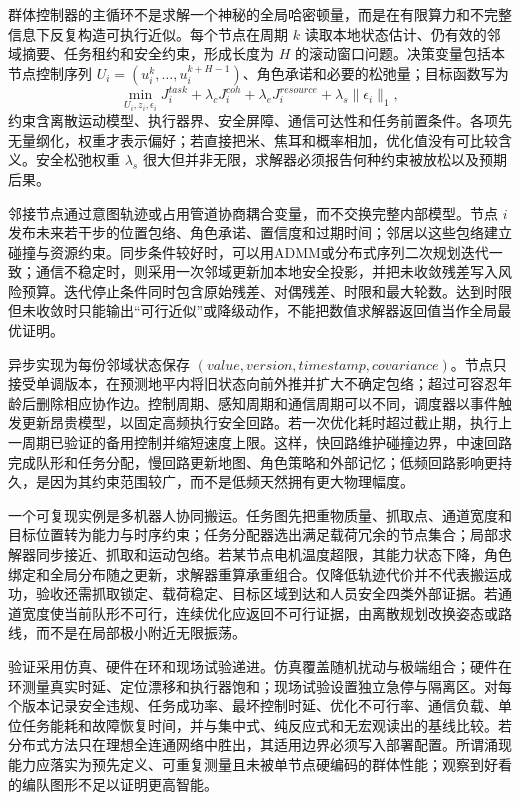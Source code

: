 群体控制器的主循环不是求解一个神秘的全局哈密顿量，而是在有限算力和不完整信息下反复构造可执行近似。每个节点在周期 $k$ 读取本地状态估计、仍有效的邻域摘要、任务租约和安全约束，形成长度为 $H$ 的滚动窗口问题。决策变量包括本节点控制序列 $U_i=(u_i^k,\ldots,u_i^{k+H-1})$、角色承诺和必要的松弛量；目标函数写为
\[
 \min_{U_i,z_i,\epsilon_i} J_i^{task}+\lambda_cJ_i^{coh}
 +\lambda_eJ_i^{resource}+\lambda_s\|\epsilon_i\|_1,
\]
约束含离散运动模型、执行器界、安全屏障、通信可达性和任务前置条件。各项先无量纲化，权重才表示偏好；若直接把米、焦耳和概率相加，优化值没有可比较含义。安全松弛权重 $\lambda_s$ 很大但并非无限，求解器必须报告何种约束被放松以及预期后果。

邻接节点通过意图轨迹或占用管道协商耦合变量，而不交换完整内部模型。节点 $i$ 发布未来若干步的位置包络、角色承诺、置信度和过期时间；邻居以这些包络建立碰撞与资源约束。同步条件较好时，可以用ADMM或分布式序列二次规划迭代一致；通信不稳定时，则采用一次邻域更新加本地安全投影，并把未收敛残差写入风险预算。迭代停止条件同时包含原始残差、对偶残差、时限和最大轮数。达到时限但未收敛时只能输出“可行近似”或降级动作，不能把数值求解器返回值当作全局最优证明。

异步实现为每份邻域状态保存 $(value,version,timestamp,covariance)$。节点只接受单调版本，在预测地平内将旧状态向前外推并扩大不确定包络；超过可容忍年龄后删除相应协作边。控制周期、感知周期和通信周期可以不同，调度器以事件触发更新昂贵模型，以固定高频执行安全回路。若一次优化耗时超过截止期，执行上一周期已验证的备用控制并缩短速度上限。这样，快回路维护碰撞边界，中速回路完成队形和任务分配，慢回路更新地图、角色策略和外部记忆；低频回路影响更持久，是因为其约束范围较广，而不是低频天然拥有更大物理幅度。

一个可复现实例是多机器人协同搬运。任务图先把重物质量、抓取点、通道宽度和目标位置转为能力与时序约束；任务分配器选出满足载荷冗余的节点集合；局部求解器同步接近、抓取和运动包络。若某节点电机温度超限，其能力状态下降，角色绑定和全局分布随之更新，求解器重算承重组合。仅降低轨迹代价并不代表搬运成功，验收还需抓取锁定、载荷稳定、目标区域到达和人员安全四类外部证据。若通道宽度使当前队形不可行，连续优化应返回不可行证据，由离散规划改换姿态或路线，而不是在局部极小附近无限振荡。

验证采用仿真、硬件在环和现场试验递进。仿真覆盖随机扰动与极端组合；硬件在环测量真实时延、定位漂移和执行器饱和；现场试验设置独立急停与隔离区。对每个版本记录安全违规、任务成功率、最坏控制时延、优化不可行率、通信负载、单位任务能耗和故障恢复时间，并与集中式、纯反应式和无宏观读出的基线比较。若分布式方法只在理想全连通网络中胜出，其适用边界必须写入部署配置。所谓涌现能力应落实为预先定义、可重复测量且未被单节点硬编码的群体性能；观察到好看的编队图形不足以证明更高智能。

